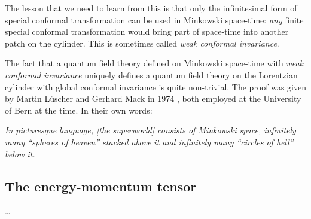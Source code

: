 \documentclass[a4paper,12pt]{article}
\numberwithin{equation}{section}
\begin{document}
The lesson that we need to learn from this is that only the infinitesimal form of special conformal transformation can be used in Minkowski space-time: \emph{any} finite special conformal transformation would bring part of space-time into another patch on the cylinder.
This is sometimes called \emph{weak conformal invariance}.

The fact that a quantum field theory defined on Minkowski space-time with \emph{weak conformal invariance} uniquely defines a quantum field theory on the Lorentzian cylinder with global conformal invariance is quite non-trivial. The proof was given by Martin Lüscher and Gerhard Mack in 1974 \cite{Luscher:1974ez}, both employed at the University of Bern at the time. In their own words:

\begin{center}

\parbox{11cm}{%
\emph{In picturesque language, [the superworld] consists of Minkowski space, infinitely many ``spheres of heaven'' stacked above it and infinitely many ``circles of hell'' below it.}}

\end{center}


\subsection{The energy-momentum tensor}

\ldots

%
%
%
%
%




\end{document}
